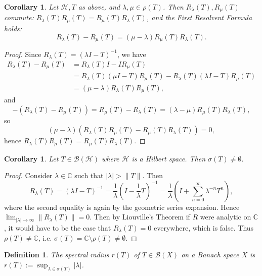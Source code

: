 \documentclass[12pt,oneside]{report}
\newtheorem{cor}[thm]{Corollary}
\newtheorem{defn}[thm]{Definition}
\begin{document}
\begin{cor}\label{first-resolvent-formula}
    Let $\mathscr{H}, T$ as above, and $\lambda,\mu \in \rho(T)$. Then $R_{\lambda}(T), R_{\mu}(T)$ commute: $R_{\lambda}(T)R_{\mu}(T) = R_{\mu}(T)R_{\lambda}(T)$, and the First Resolvent Formula holds: $$R_{\lambda}(T) - R_{\mu}(T) = (\mu - \lambda)R_{\mu}(T)R_{\lambda}(T).$$
\end{cor}
\begin{proof}
    Since $R_{\lambda}(T) = (\lambda I - T)^{-1}$,  we have 
\begin{align*}
R_{\lambda}(T) - R_{\mu}(T) &= R_{\lambda}(T)I - IR_{\mu}(T) \\
&= R_{\lambda}(T)(\mu I - T)R_{\mu}(T) - R_{\lambda}(T)(\lambda I - T)R_{\mu}(T) \\
&= (\mu-\lambda)R_{\lambda}(T)R_{\mu}(T),
\end{align*} and $$- (R_{\lambda}(T) - R_{\mu}(T)) = R_{\mu}(T) - R_{\lambda}(T) = (\lambda-\mu)R_{\mu}(T)R_{\lambda}(T),$$ so $$(\mu - \lambda)(R_{\lambda}(T)R_{\mu}(T) - R_{\mu}(T)R_{\lambda}(T)) = 0,$$ hence $R_{\lambda}(T)R_{\mu}(T) = R_{\mu}(T)R_{\lambda}(T)$.
\end{proof}

\begin{cor}\label{spectrum-nonempty}
    Let $T \in \mathscr{B}(\mathscr{H})$ where $\mathscr{H}$ is a Hilbert space. Then $\sigma(T) \neq \emptyset$.
\end{cor}
\begin{proof}
    Consider $\lambda \in \mathbb{C}$ such that $|\lambda| > \|T\|$. Then $$R_{\lambda}(T) = (\lambda I - T)^{-1} = \frac{1}{\lambda}\left( I - \frac{1}{\lambda}T \right)^{-1} = \frac{1}{\lambda}\left( I + \sum_{n=0}^{\infty} \lambda^{-n} T^{n} \right),$$ where the second equality is again by the geometric series expansion. Hence $\lim_{ |\lambda| \to \infty } \|R_{\lambda}(T)\| = 0$. Then by Liouville's Theorem if $R$ were analytic on $\mathbb{C}$, it would have to be the case that $R_{\lambda}(T) = 0$ everywhere, which is false. Thus $\rho(T) \neq \mathbb{C}$, i.e. $\sigma(T) = \mathbb{C} \setminus \rho(T) \neq \emptyset$.
\end{proof}

\begin{defn}
    The spectral radius $r(T)$ of $T \in \mathscr{B}(X)$ on a Banach space $X$ is $r(T) := \sup_{\lambda \in \sigma(T)} |\lambda|$.
\end{defn}
\end{document}
